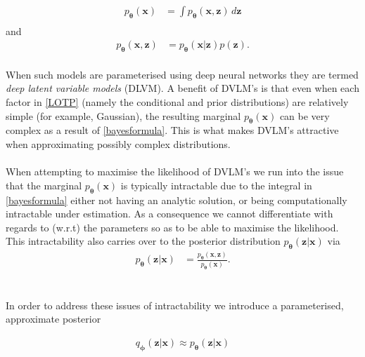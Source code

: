 \documentclass{article}
\theoremstyle{definition}
\begin{document}
\begin{align}
\label{bayesformula}
p_{\boldsymbol{\theta}}(\mathbf{x}) &= \int p_{\boldsymbol{\theta}}(\mathbf{x}, \mathbf{z}) \, d\mathbf{z} \\
\end{align}
and
\begin{align}
\label{LOTP}
p_{\boldsymbol{\theta}}(\mathbf{x}, \mathbf{z}) &= p_{\boldsymbol{\theta}}(\mathbf{x}|\mathbf{z})p(\mathbf{z}).
\end{align}
\\
When such models are parameterised using deep neural networks they are termed \textit{deep latent variable models} (DLVM). A benefit of DVLM's is that even when each factor in \ref{LOTP} (namely the conditional and prior distributions) are relatively simple (for example, Gaussian), the resulting marginal $p_{\boldsymbol{\theta}}(\mathbf{x})$ can be very complex as a result of \ref{bayesformula}. This is what makes DVLM's attractive when approximating possibly complex distributions.
\\\\
When attempting to maximise the likelihood of DVLM's we run into the issue that the marginal $p_{\boldsymbol{\mathbf{\theta}}}(\mathbf{x})$ is typically intractable due to the integral in \ref{bayesformula} either not having an analytic solution, or being computationally intractable under estimation. As a consequence we cannot differentiate with regards to (w.r.t) the parameters so as to be able to maximise the likelihood. This intractability also carries over to the posterior distribution $p_{\boldsymbol{\theta}}(\mathbf{z}|\mathbf{x})$ via 
\begin{align}
\label{Bayes2}
p_{\boldsymbol{\theta}}(\mathbf{z}|\mathbf{x}) &= \frac{p_{\boldsymbol{\theta}}(\mathbf{x}, \mathbf{z})}{p_{\boldsymbol{\theta}}(\mathbf{x})}.
\end{align}
\\\\
In order to address these issues of intractability we introduce a parameterised, approximate posterior

\begin{align}
q_{\boldsymbol{\phi}}(\mathbf{z}|\mathbf{x}) \approx p_{\boldsymbol{\theta}}(\mathbf{z}|\mathbf{x})
\end{align}
\end{document}
